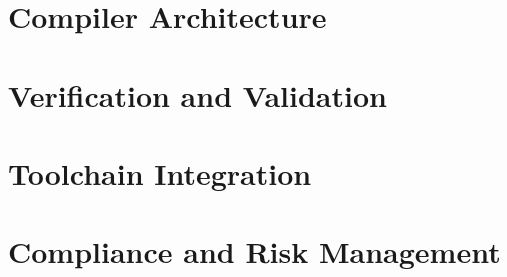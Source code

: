 \documentclass[12pt,a4paper]{report}
\theoremstyle{definition}
\theoremstyle{remark}
\begin{document}





\part{Compiler Architecture}




\part{Verification and Validation}





\part{Toolchain Integration}






\part{Compliance and Risk Management}





\end{document}
